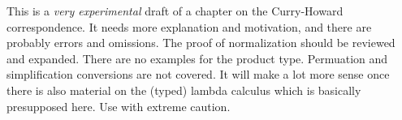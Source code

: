 \documentclass[../../../include/open-logic-chapter]{subfiles}
\begin{document}

\begin{editorial}
  This is a \emph{very experimental} draft of a chapter on the
  Curry-Howard correspondence.  It needs more explanation and
  motivation, and there are probably errors and omissions. The proof
  of normalization should be reviewed and expanded. There are no
  examples for the product type. Permuation and simplification
  conversions are not covered. It will make a lot more sense once
  there is also material on the (typed) lambda calculus which is
  basically presupposed here. Use with extreme caution.
\end{editorial}


\OLEndChapterHook
\end{document}
